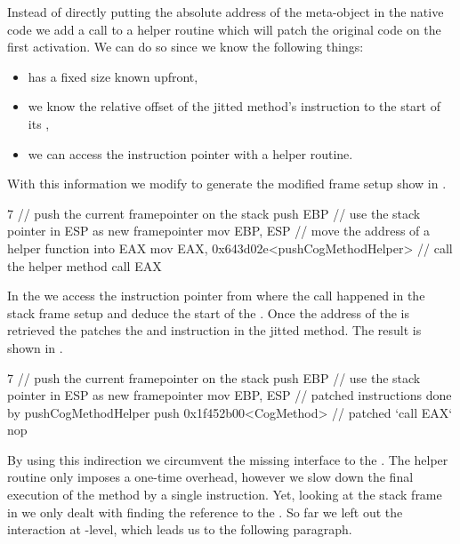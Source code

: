 Instead of directly putting the absolute address of the meta-object in the native code we add a call to a helper routine which will patch the original code on the first activation.
We can do so since we know the following things:
\begin{itemize}[noitemsep,nolistsep]
	\item \CogMethod has a fixed size known upfront,
	\item we know the relative offset of the jitted method's instruction to the start of its \CogMethod,
	\item we can access the instruction pointer with a helper routine.
\end{itemize}
%
\noindent With this information we modify \NBJ to generate the modified frame setup show in .
%
\begin{numstcode}[
	caption={\NBJ Stack Frame Setup},
	label={lst:val-nabujito-frame-setup}]{7}
// push the current framepointer on the stack
push EBP
// use the stack pointer in ESP as new framepointer 
mov  EBP, ESP
// move the address of a helper function into EAX
mov  EAX, 0x643d02e<pushCogMethodHelper>
// call the helper method
call EAX
\end{numstcode}
%
In the  we access the instruction pointer from where the call happened in the stack frame setup and deduce the start of the \CogMethod.
Once the address of the \CogMethod is retrieved the  patches the  and  instruction in the jitted method.
The result is shown in .
%
\begin{numstcode}[
	caption={\NBJ Patched Stack Frame Setup},
	label={lst:val-nabujito-patched-frame-setup}]{7}
// push the current framepointer on the stack
push EBP
// use the stack pointer in ESP as new framepointer 
mov  EBP, ESP
// patched instructions done by pushCogMethodHelper
push 0x1f452b00<CogMethod>
// patched `call EAX`
nop
\end{numstcode}
%
By using this indirection we circumvent the missing interface to the \JIT.
The helper routine only imposes a one-time overhead, however we slow down the final execution of the \NBJ method by a single  instruction.
Yet, looking at the \Cog stack frame in  we only dealt with finding the reference to the \CogMethod.
So far we left out the \GC interaction at \JIT-level, which leads us to the following paragraph.

